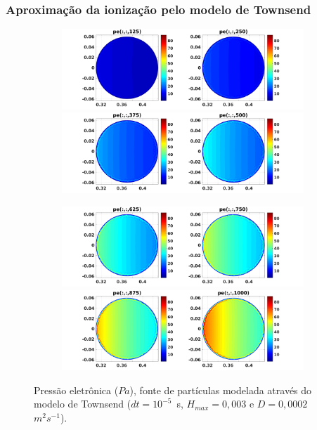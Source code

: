 \documentclass[aspectratio=169]{beamer}
\begin{document}
\begin{frame}		
\frametitle{Aproximação da ionização pelo modelo de Townsend}
\begin{figure}[H]
\begin{subfigure}{0.43\textwidth}
\includegraphics[scale=0.24]{../SImulacao_breakdown/PDE/petod1B2.png}  
\includegraphics[scale=0.24]{../SImulacao_breakdown/PDE/petod2B2.png} 
\end{subfigure}
\begin{subfigure}{0.43\textwidth}
\includegraphics[scale=0.24]{../SImulacao_breakdown/PDE/petod3B2.png} 
\includegraphics[scale=0.24]{../SImulacao_breakdown/PDE/petod4B2.png}
\end{subfigure}	
\caption{Pressão eletrônica ($Pa$), fonte de partículas modelada através do modelo de Townsend ($dt=10^{-5}$\ s, $H_{max} = 0,003$ e $D=0,0002$\ $m^2s^{-1}$).}
\end{figure}
\end{frame}
\end{document}
